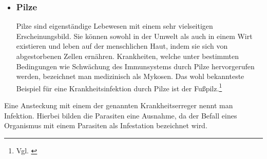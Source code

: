 \documentclass[12pt]{article}
\begin{document}
\begin{itemize}
    \item \subsubsection{Pilze}
    Pilze sind eigenständige Lebewesen mit einem sehr vielseitigen Erscheinungsbild. Sie können sowohl in der Umwelt als auch in einem Wirt existieren und leben auf der menschlichen Haut, indem sie sich von abgestorbenen Zellen ernähren. Krankheiten, welche unter bestimmten Bedingungen wie Schwächung des Immunsystems durch Pilze hervorgerufen werden, bezeichnet man medizinisch als Mykosen. Das wohl bekannteste Beispiel für eine Krankheitsinfektion durch Pilze ist der Fußpilz.\footnote{Vgl. \cite{pilz22}}
    
\end{itemize}
Eine Ansteckung mit einem der genannten Krankheitserreger nennt man Infektion. Hierbei bilden die Parasiten eine Ausnahme, da der Befall eines Organismus mit einem Parasiten als Infestation bezeichnet wird.
\end{document}
